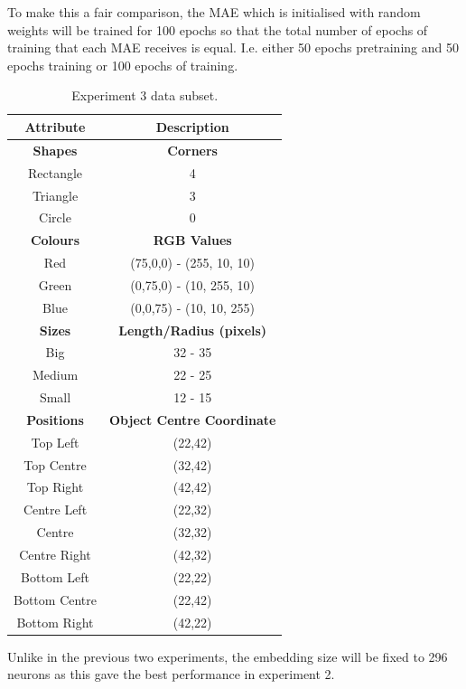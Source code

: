 To make this a fair comparison, the MAE which is initialised with random weights will be trained for 100 epochs so that the total number of epochs of training that each \ac{MAE} receives is equal. I.e. either 50 epochs pretraining and 50 epochs training or 100 epochs of training.


\begin{table}[h]
\centering
\begin{tabular}{|c|c|}
\hline
\textbf{Attribute} & \textbf{Description} \\ \hline \hline
\textbf{Shapes} & \textbf{Corners} \\ \hline
Rectangle & 4\\ \hline
Triangle & 3\\ \hline
Circle & 0\\ \hline 

\textbf{Colours} & \textbf{RGB Values}	\\ \hline	
Red & (75,0,0) - (255, 10, 10)\\ \hline
Green  & (0,75,0) - (10, 255, 10)\\ \hline
Blue   & (0,0,75) - (10, 10, 255)\\ \hline

\textbf{Sizes} & 	\textbf{Length/Radius (pixels)} \\ \hline			  
Big    & 32 - 35  \\ \hline
Medium & 22 - 25 \\ \hline
Small  & 12 - 15 \\ \hline 

\textbf{Positions} & \textbf{Object Centre Coordinate}	\\ \hline					  
Top Left & (22,42)\\ \hline	
Top Centre & (32,42)\\ \hline
Top Right & (42,42)\\ \hline
Centre Left &(22,32)\\ \hline
Centre & (32,32)\\ \hline
Centre Right &(42,32)\\ \hline
Bottom Left & (22,22)\\ \hline
Bottom Centre & (22,42)\\ \hline
Bottom Right & (42,22)\\ \hline				
\end{tabular}
\caption{Experiment 3 data subset.}
\label{tab:exp3_data} 
\end{table}

Unlike in the previous two experiments, the embedding size will be fixed to 296 neurons as this gave the best performance in experiment 2.

